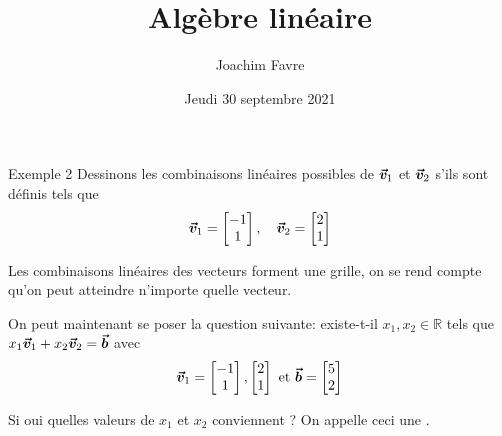 \documentclass{article}
\title{Algèbre linéaire}
\author{Joachim Favre}
\date{Jeudi 30 septembre 2021}
\begin{document}
\maketitle


\begin{parag}{Exemple 2}
    Dessinons les combinaisons linéaires possibles de $\bm{\protect\vec{v}}_1$ et $\bm{\protect\vec{v}}_2$ s'ils sont définis tels que
    \[\bm{\protect\vec{v}}_1 = \begin{bmatrix} -1 \\ 1 \end{bmatrix}, \quad \bm{\protect\vec{v}}_2 = \begin{bmatrix} 2 \\ 1 \end{bmatrix}  \]



    Les combinaisons linéaires des vecteurs forment une grille, on se rend compte qu'on peut atteindre n'importe quelle vecteur.

    On peut maintenant se poser la question suivante: existe-t-il $x_1, x_2 \in \mathbb{R}$ tels que $x_1 \bm{\protect\vec{v}}_1 + x_2 \bm{\protect\vec{v}}_2 = \bm{\protect\vec{b}}$ avec
    \[\bm{\protect\vec{v}}_1 = \begin{bmatrix} -1 \\ 1 \end{bmatrix}, \begin{bmatrix} 2 \\ 1 \end{bmatrix} \text{ et } \bm{\protect\vec{b}} = \begin{bmatrix} 5 \\ 2 \end{bmatrix} \]

    Si oui quelles valeurs de $x_1$ et $x_2$ conviennent ? On appelle ceci une .
\end{parag}
\end{document}
